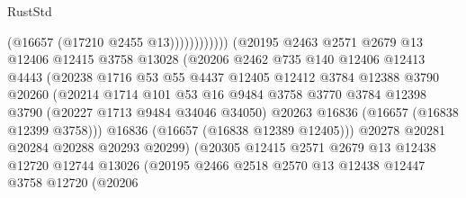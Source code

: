 \begin{lexlean}{RustStd}
\begin{coremodule}
                                            (@16657 (@17210 @2455 @13))))))))))))
                        (@20195
                          @2463
                          @2571
                          @2679
                          @13
                          @12406
                          @12415
                          @3758
                          @13028
                          (@20206
                            @2462
                            @735
                            @140
                            @12406
                            @12413
                            @4443
                            (@20238
                              @1716
                              @53
                              @55
                              @4437
                              @12405
                              @12412
                              @3784
                              @12388
                              @3790
                              @20260
                              (@20214
                                @1714
                                @101
                                @53
                                @16
                                @9484
                                @3758
                                @3770
                                @3784
                                @12398
                                @3790
                                (@20227 @1713 @9484 @34046 @34050)
                                @20263
                                @16836
                                (@16657 (@16838 @12399 @3758)))
                              @16836
                              (@16657 (@16838 @12389 @12405)))
                            @20278
                            @20281
                            @20284
                            @20288
                            @20293
                            @20299)
                          (@20305
                            @12415
                            @2571
                            @2679
                            @13
                            @12438
                            @12720
                            @12744
                            @13026
                            (@20195
                              @2466
                              @2518
                              @2570
                              @13
                              @12438
                              @12447
                              @3758
                              @12720
                              (@20206

\end{coremodule}
\end{lexlean}
